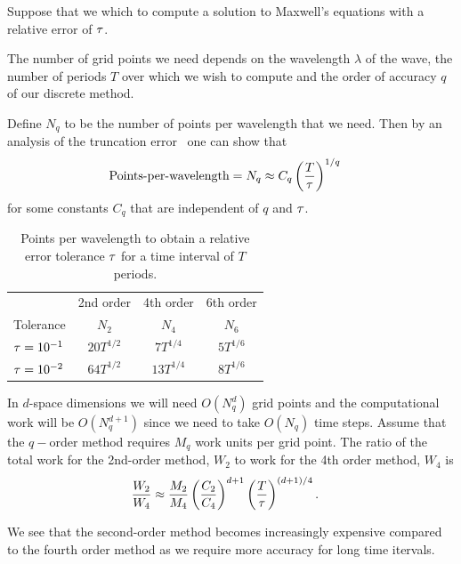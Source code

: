 \documentclass[11pt]{article}
\begin{document}
Suppose that we which to compute a solution to Maxwell's equations with a relative error
of $\tau$. 

The number of grid points we need depends on the wavelength $\lambda$ of the wave, the number 
of periods $T$ over which we wish to compute and the order of accuracy $q$ of our discrete
method.

Define $N_q$ to be the number of points per wavelength that we need. Then by an analysis of the
truncation error~\cite{GustafssonKreissOliger95} one can show that
\begin{align*}
  \text{Points-per-wavelength} &= N_q \approx C_q \left( {T \over \tau}\right)^{1/q}
\end{align*}
for some constants $C_q$ that are independent of $q$ and $\tau$.


\begin{table}[hbt]
\begin{center}
\begin{tabular}{|l|c|c|c|}\hline
                    & 2nd order   & 4th order    & 6th order   \\
Tolerance           & $N_2$         & $N_4$          & $N_6$          \\ \hline
$\tau=10^{-1}$ & $20 T^{1/2}$  & $7 T^{1/4}$    &  $5 T^{1/6}$   \\
$\tau=10^{-2}$ & $64 T^{1/2}$  &$13 T^{1/4}$    &  $8 T^{1/6}$   \\\hline
\end{tabular}
\end{center}
\caption{ Points per wavelength to obtain a relative error tolerance $\tau$ for a time interval of $T$ periods.}
\label{tab:PPW}
\end{table}


In $d$-space dimensions we will need $O(N_q^d)$ grid points and the computational work will be $O(N_q^{d+1})$
since we need to take $O(N_q)$ time steps. Assume that the $q-$order method requires $M_q$ work units
per grid point. The ratio of the total work for the 2nd-order method, $W_2$ to work for the 
4th order method, $W_4$ is 
\begin{align*}
  {W_2 \over W_4 } & 
    \approx {M_2 \over M_4} \left({C_2 \over C_4}\right)^{d+1}   \left( {T \over \tau}\right)^{(d+1)/4}  .
\end{align*}

We see that the second-order method becomes increasingly expensive
compared to the fourth order method as we require more accuracy for long time itervals.
\end{document}

